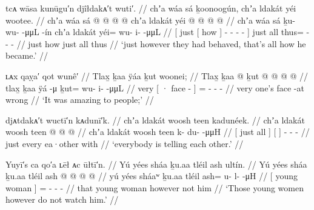 \ex\label{ex:100-217-how-he-behaved}%
%
\begingl
	\glpreamble	tcᴀ wāsa kunūgu′n djîłdakᴀ′t wuti′. //
	\glpreamble	chʼa wáa sá ḵoonoogún, chʼa ldakát yéi wootee. //
	\gla	{} chʼa {} wáa sá {} 
			 @ {} @ {} @ {} @ {} {}
		chʼa ldakát
		yéi @  @ {} @ {} @ {} //
	\glb	{} chʼa {} wáa sá {}
			ḵu- wu-  -μμL -ín {}
		chʼa ldakát
		yéi= wu- i-  -μμL //
	\glc	{}[ just {}[ how  {}]
			- -  - - {}]
		just all
		thus=  - -  - //
	\gld	{} just {} how  {}
			 {} {} {} {} {}
		just all
		thus  {} {} {} //
	\glft	‘just however they had behaved, that’s all how he became.’
		//
\endgl
\xe

\ex\label{ex:100-218-amazing-to-one}%
%
\begingl
	\glpreamble	ʟᴀx qaỵa′ qot wunê′ //
	\glpreamble	Tlax̱ ḵaa ÿáa ḵut woonei; //
	\gla	Tlax̱ {} ḵaa  @ {} {}
		ḵut @  @ {} @ {} @ {} //
	\glb	tlax̱ {} ḵaa ÿá -μ {}
		ḵut= wu- i-  -μμL //
	\glc	very {}[ · face - {}]
		= - -  - //
	\gld	very {} one’s face -at {}
		wrong\•  {} {} {} //
	\glft	‘It was amazing to people;’
		//
\endgl
\xe

\ex\label{ex:100-219-amazing-to-one}%
%
\begingl
	\glpreamble	djᴀtdakᴀ′t wuctī′n kᴀdunī′k. //
	\glpreamble	chʼa ldakát woosh teen kadunéek. //
	\gla	{} chʼa ldakát {}
		{} woosh teen {}
		 @ {} @ {} @ {} //
	\glb	{} chʼa ldakát {}
		{} woosh teen {}
		k- du-  -μμH //
	\glc	{}[ just all {}]
		{}[   {}]
		- -  - //
	\gld	{} just every {}
		{} ea·other with {}
		 {} {} {} //
	\glft	‘everybody is telling each other.’
		//
\endgl
\xe

\ex\label{ex:100-220-young-women-not-watch}%
%
\begingl
	\glpreamble	Yuyī′s ca qo′a ʟēł ᴀc ūłtī′n. //
	\glpreamble	Yú yées sháa ḵu.aa tléil ash ultín. //
	\gla	{} Yú yées sháa {} ḵu.aa 
		tléil ash @  @ {} @ {} @ {} //
	\glb	{} yú yées sháaʷ {} ḵu.aa
		tléil ash= u- l-  -μH //
	\glc	{}[  young woman {}] 
		 = - -  - //
	\gld	{} that young woman {} however
		not him  {} {} {}  //
	\glft	‘Those young women however do not watch him.’
		//
\endgl
\xe

